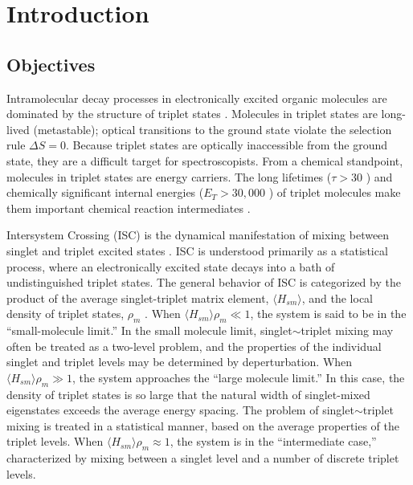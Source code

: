 % 

\chapter{Introduction}
\label{chapter:intro}

\section{Objectives}

Intramolecular decay processes in electronically excited organic
molecules are dominated by the structure of triplet states
\cite{mcglynn69, medvedev95}.  Molecules in triplet states are
long-lived (metastable); optical transitions to the ground state
violate the selection rule $\Delta S = 0$.  Because triplet states are
optically inaccessible from the ground state, they are a difficult
target for spectroscopists.  From a chemical standpoint, molecules in
triplet states are energy carriers.  The long lifetimes ($\tau > 30$
\microsec) and chemically significant internal energies ($E_T >
30,000$ \rcm) of triplet molecules make them important chemical
reaction intermediates \cite{calvert66}.

Intersystem Crossing (ISC) is the dynamical manifestation of mixing
between singlet and triplet excited states \cite{robinson67,
  kommandeur87, lombardi88, tramer05}.  ISC is understood primarily as
a statistical process, where an electronically excited state decays
into a bath of undistinguished triplet states.  The general behavior
of ISC is categorized by the product of the average singlet-triplet
matrix element, $\langle H_{sm} \rangle$, and the local density of
triplet states, $\rho_m$ \cite{robinson67, kommandeur87, freed76}.
When $\langle H_{sm} \rangle \rho_m \ll 1$, the system is said to be
in the ``small-molecule limit.''  In the small molecule limit,
singlet$\sim$triplet mixing may often be treated as a two-level
problem, and the properties of the individual singlet and triplet
levels may be determined by deperturbation.  When $\langle H_{sm}
\rangle \rho_m \gg 1$, the system approaches the ``large molecule
limit.''  In this case, the density of triplet states is so large that
the natural width of singlet-mixed eigenstates exceeds the average
energy spacing.  The problem of singlet$\sim$triplet mixing is treated
in a statistical manner, based on the average properties of the
triplet levels.  When $\langle H_{sm} \rangle \rho_m \approx 1$, the
system is in the ``intermediate case,'' characterized by mixing
between a singlet level and a number of discrete triplet levels.

